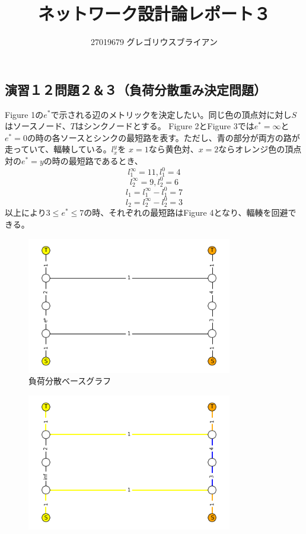 \documentclass{report}
\title{ネットワーク設計論レポート３}
\author{27019679 グレゴリウスブライアン}
\begin{document}
\begin{CJK}{UTF8}{min}
    \maketitle


    \clearpage
    \section*{演習１２問題２＆３（負荷分散重み決定問題）}
    Figure 1の$e^*$で示される辺のメトリックを決定したい。同じ色の頂点対に対し$S$はソースノード、$T$はシンクノードとする。
    Figure 2とFigure 3では$e^*=\infty$と$e^*=0$の時の各ソースとシンクの最短路を表す。ただし、青の部分が両方の路が走っていて、輻輳している。$l_x^y$を
    $x=1$なら黄色対、$x=2$ならオレンジ色の頂点対の$e^*=y$の時の最短路であるとき、
    \[l_1^\infty=11,l_1^0=4\]
    \[l_2^\infty=9,l_2^0=6\]
    \[l_1=l_1^\infty-l_1^0=7\]
    \[l_2=l_2^\infty-l_2^0=3\]
    以上により$3\leq e^* \leq 7$の時、それぞれの最短路はFigure 4となり、輻輳を回避できる。
    \begin{figure}[!h]
        \centerline{\includegraphics[width=0.8\textwidth]{data/ex12-base.png}}
        \caption{負荷分散ベースグラフ}
    \end{figure}
    \begin{figure}[!h]
        \centerline{\includegraphics[width=0.8\textwidth]{data/ex12-linf.png}}

\end{figure}
\end{CJK}
\end{document}
